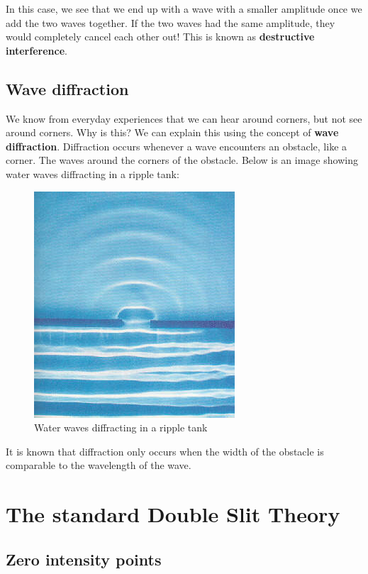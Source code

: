 \documentclass{paper}
\begin{document}
In this case, we see that we  end up with a wave with a smaller amplitude once we add the two waves together. If the two waves had the same amplitude, they would completely cancel each other out! This is known as \textbf{destructive interference}.

\subsection{Wave diffraction}
We know from everyday experiences that we can hear around corners, but not see around corners. Why is this? We can explain this using the concept of \textbf{wave diffraction}. Diffraction occurs whenever a wave encounters an obstacle, like a corner. The waves  around the corners of the obstacle. Below is an image showing water waves diffracting in a ripple tank:

\begin{figure}[H]
    \caption{Water waves diffracting in a ripple tank}
    \includegraphics{diagrams/water-wave-diffraction.jpg}
\end{figure}

It is known that diffraction only occurs when the width of the obstacle is comparable to the wavelength of the wave.


\section{The standard Double Slit Theory}
\subsection{Zero intensity points}
\label{section:zero-intensity}
\end{document}
